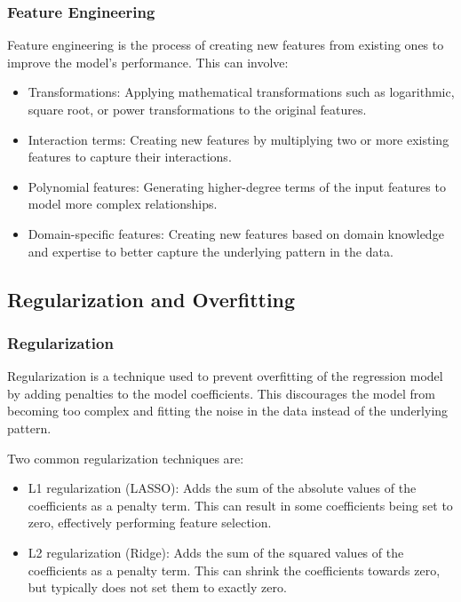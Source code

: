 \documentclass{beamer}
\begin{document}
\subsubsection{Feature Engineering}
Feature engineering is the process of creating new features from existing ones to improve the model's performance. This can involve:

\begin{itemize}
\item Transformations: Applying mathematical transformations such as logarithmic, square root, or power transformations to the original features.
\item Interaction terms: Creating new features by multiplying two or more existing features to capture their interactions.
\item Polynomial features: Generating higher-degree terms of the input features to model more complex relationships.
\item Domain-specific features: Creating new features based on domain knowledge and expertise to better capture the underlying pattern in the data.
\end{itemize}

\subsection{Regularization and Overfitting}

\subsubsection{Regularization}
Regularization is a technique used to prevent overfitting of the regression model by adding penalties to the model coefficients. This discourages the model from becoming too complex and fitting the noise in the data instead of the underlying pattern.

Two common regularization techniques are:

\begin{itemize}
\item L1 regularization (LASSO): Adds the sum of the absolute values of the coefficients as a penalty term. This can result in some coefficients being set to zero, effectively performing feature selection.
\item L2 regularization (Ridge): Adds the sum of the squared values of the coefficients as a penalty term. This can shrink the coefficients towards zero, but typically does not set them to exactly zero.
\end{itemize}
\end{document}
